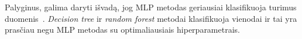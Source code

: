 


Palyginus, galima daryti išvadą, jog MLP metodas geriausiai klasifikuoja turimus duomenis~\cite{iris_53}. \textit{Decision tree} ir \textit{random forest} metodai klasifikuoja vienodai ir tai yra prasčiau negu MLP metodas su optimaliausiais hiperparametrais.